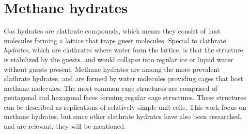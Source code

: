 \chapter{Methane hydrates}
\label{ch:state_of_the_science}
Gas hydrates are clathrate compounds, which means they consist of host molecules forming a lattice that traps guest molecules. Special to clathrate \emph{hydrates}, which are clathrates where water form the lattice, is that the structure is stabilized by the guests, and would collapse into regular ice or liquid water without guests present. Methane hydrates are among the more prevalent clathrate hydrates, and are formed by water molecules providing cages that host methane molecules. The most common cage structures are comprised of pentagonal and hexagonal faces forming regular cage structures. These structures can be described as replications of relatively simple unit cells. This work focus on methane hydrates, but since other clathrate hydrates have also been researched, and are relevant, they will be mentioned.

